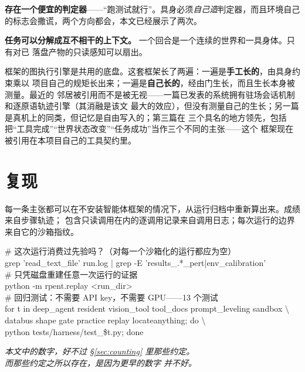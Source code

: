 \documentclass[11pt,a4paper,UTF8,fontset=macnew]{ctexrep}
\newcommand{\keyrule}[1]{\textbf{\textcolor{acc}{#1}}}
\begin{document}
\keyrule{存在一个便宜的判定器}——“跑测试就行”。具身必须\emph{自己造}判定器，而且环境自己
的标志会撒谎，两个方向都会，本文已经展示了两次。

\keyrule{任务可以分解成互不相干的上下文。} 一个回合是一个连续的世界和一具身体。只有对已
落盘产物的只读感知可以扇出。

框架的图执行引擎是共用的底盘。这套框架长了两遍：一遍是\textbf{手工长的}，由具身约束乘以
项目自己的规矩长出来；一遍是\textbf{自己长的}，经由门生长，而且生长本身被测量。最近的
邻居被引用而不是被无视——一篇已发表的系统拥有驻场会话机制和逐原语轨迹引擎（其消融是该文
最大的效应），但没有测量自己的生长；另一篇是真机上的同类，但记忆是自由写入的；第三篇在
三个具名的地方领先，包括把“工具完成”“世界状态改变”“任务成功”当作三个不同的主张——这个
框架现在被引用在本项目自己的工具契约里。

\chapter{复现}

每一条主张都可以在不安装智能体框架的情况下，从运行归档中重新算出来。成绩来自步骤轨迹；
包含只读调用在内的逐调用记录来自调用日志；每次运行的边界来自它的沙箱指纹。

\begin{evidence}[title={检查}]
\ttfamily\footnotesize
\# 这次运行消费过先验吗？（对每一个沙箱化的运行都应为空）\\
grep 'read\_text\_file' run.log | grep -E 'results\_.*\_pert|env\_calibration'\\[0.5em]
\# 只凭磁盘重建任意一次运行的证据\\
python -m rpent.replay \textless run\_dir\textgreater\\[0.5em]
\# 回归测试：不需要 API key，不需要 GPU——13 个测试\\
for t in deep\_agent resident vision\_tool tool\_docs prompt\_leveling sandbox \textbackslash\\
\hspace*{2.2em}databus shape gate practice replay locateanything; do \textbackslash\\
\hspace*{2.2em}python tests/harness/test\_\$t.py; done
\end{evidence}

\vspace{1em}
\begin{center}
\textit{本文中的数字，好不过 §\ref{sec:counting} 里那些约定。\\ 而那些约定之所以存在，是因为更早的数字
并不好。}
\end{center}
\end{document}
